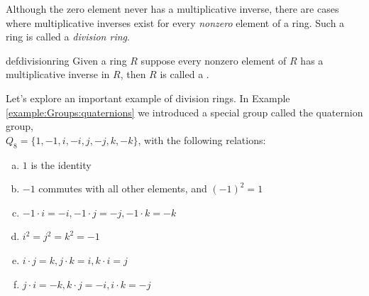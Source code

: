 %


Although the zero element never has a multiplicative inverse, there are cases where multiplicative inverses exist for every \emph{nonzero} element of a ring. Such a ring is called a \emph{division ring}. 

\begin{defn}{defdivisionring}
Given a ring $R$ suppose every nonzero element of $R$ has a multiplicative inverse in $R$, then $R$ is called a .
\end{defn}

Let's explore an important example of division rings.  In Example \ref{example:Groups:quaternions} we introduced a special group called the quaternion group,\\ $Q_8=\{1,-1,i,-i,j,-j,k,-k\}$, with the following relations:
\begin{enumerate}[(a)]
\item
$1$ is the identity
\item
$-1$ commutes with all other elements, and $(-1)^2=1$
\item
$-1 \cdot i = -i, -1 \cdot j = -j, -1 \cdot k = -k$
\item
$i^2 = j^2=k^2 = -1$
\item
$i \cdot j = k, j \cdot k = i, k \cdot i=j$
\item
$j \cdot i = -k, k \cdot j=-i, i \cdot k = -j$ 
\end{enumerate}



